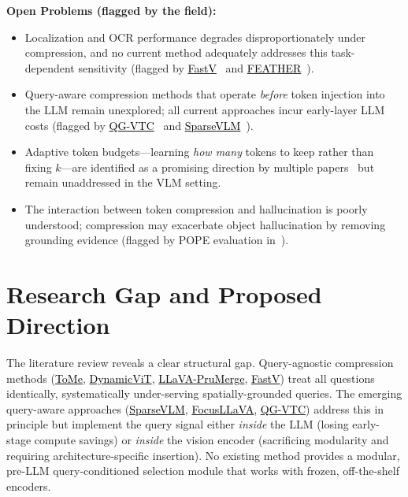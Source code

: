 \documentclass[11pt,twocolumn]{article}
\newcommand{\paperhref}[2]{\href{#1}{\textcolor{black}{#2}}}
\begin{document}
\bigskip

\textbf{Open Problems (flagged by the field):}
\begin{itemize}[leftmargin=*, itemsep=2pt]
      \item Localization and OCR performance degrades disproportionately under compression, and no current method adequately addresses this task-dependent sensitivity (flagged by \paperhref{https://arxiv.org/abs/2410.04417}{FastV}~\cite{chen2024fastv} and \paperhref{https://arxiv.org/abs/2502.06789}{FEATHER}~\cite{endo2025feather}).
      \item Query-aware compression methods that operate \emph{before} token injection into the LLM remain unexplored; all current approaches incur early-layer LLM costs (flagged by \paperhref{https://doi.org/10.1016/j.neucom.2025.127012}{QG-VTC}~\cite{li2025qgvtc} and \paperhref{https://arxiv.org/abs/2504.00654}{SparseVLM}~\cite{zhang2025sparsevlm}).
    \item Adaptive token budgets---learning \emph{how many} tokens to keep rather than fixing $k$---are identified as a promising direction by multiple papers~\cite{meng2022adavit, chen2024fastv} but remain unaddressed in the VLM setting.
    \item The interaction between token compression and hallucination is poorly understood; compression may exacerbate object hallucination by removing grounding evidence (flagged by POPE evaluation in~\cite{shang2024llava}).
\end{itemize}

\section{Research Gap and Proposed Direction}
\label{sec:gap}

The literature review reveals a clear structural gap. Query-agnostic compression methods (\paperhref{https://arxiv.org/abs/2210.09461}{ToMe}, \paperhref{https://arxiv.org/abs/2106.02034}{DynamicViT}, \paperhref{https://arxiv.org/abs/2403.15388}{LLaVA-PruMerge}, \paperhref{https://arxiv.org/abs/2410.04417}{FastV}) treat all questions identically, systematically under-serving spatially-grounded queries. The emerging query-aware approaches (\paperhref{https://arxiv.org/abs/2504.00654}{SparseVLM}, \paperhref{https://arxiv.org/abs/2401.08681}{FocusLLaVA}, \paperhref{https://doi.org/10.1016/j.neucom.2025.127012}{QG-VTC}) address this in principle but implement the query signal either \emph{inside} the LLM (losing early-stage compute savings) or \emph{inside} the vision encoder (sacrificing modularity and requiring architecture-specific insertion). No existing method provides a modular, pre-LLM query-conditioned selection module that works with frozen, off-the-shelf encoders.
\end{document}

